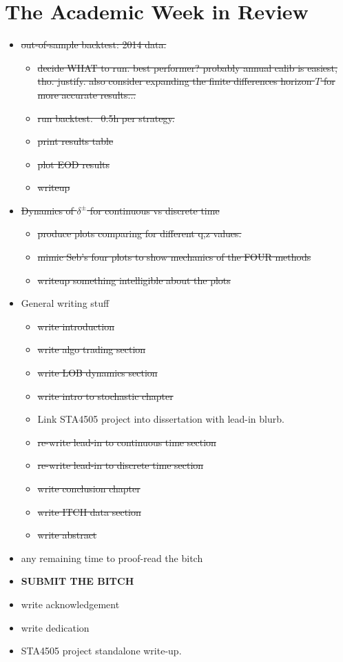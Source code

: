 \documentclass[12pt]{article}
\begin{document}
\section*{The Academic Week in Review}
\begin{itemize}[topsep=0pt,itemsep=0ex,partopsep=0ex,parsep=0ex]
\item \st{out-of-sample backtest: 2014 data.}
\begin{itemize}[topsep=0pt,itemsep=0ex,partopsep=0ex,parsep=0ex]
\item \st{decide WHAT to run. best performer? probably annual calib is easiest, tho. justify. also consider expanding the finite differences horizon $T$ for more accurate results...}
\item \st{run backtest. ~0.5h per strategy.}
\item \st{print results table}
\item \st{plot EOD results}
\item \st{writeup}
\end{itemize}

\item \st{Dynamics of $\delta^\pm$ for continuous vs discrete time}
\begin{itemize}[topsep=0pt,itemsep=0ex,partopsep=0ex,parsep=0ex]
\item \st{produce plots comparing for different q,z values.}
\item \st{mimic Seb's four plots to show mechanics of the FOUR methods}
\item \st{writeup something intelligible about the plots}
\end{itemize}

\item General writing stuff
\begin{itemize}[topsep=0pt,itemsep=0ex,partopsep=0ex,parsep=0ex]
\item \st{write introduction}
\item \st{write algo trading section}
\item \st{write LOB dynamics section}
\item \st{write intro to stochastic chapter}
\item Link STA4505 project into dissertation with lead-in blurb.
\item \st{re-write lead-in to continuous time section}
\item \st{re-write lead-in to discrete time section}
\item \st{write conclusion chapter}
\item \st{write ITCH data section}
\item \st{write abstract}
\end{itemize}

\item any remaining time to proof-read the bitch
\item {\bf SUBMIT THE BITCH}
\item write acknowledgement
\item write dedication
\item STA4505 project standalone write-up.
\end{itemize}
\end{document}
